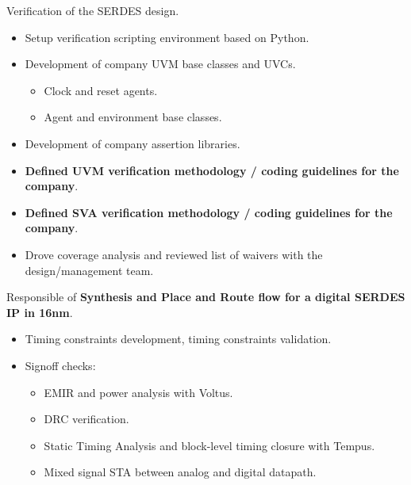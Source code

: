 \begin{cventries}
{\begin{cvitems}
        \item {Verification of the SERDES design.}
        \begin{itemize}
          \item {Setup verification scripting environment based on Python.}
          \item {Development of company UVM base classes and UVCs.}
            \begin{itemize}
              \item {Clock and reset agents.}
              \item {Agent and environment base classes.}
            \end{itemize}
          \item {Development of company assertion libraries.}
          \item {\textbf{Defined UVM verification methodology / coding guidelines for the company}.}
          \item {\textbf{Defined SVA verification methodology / coding guidelines for the company}.}
          \item {Drove coverage analysis and reviewed list of waivers with the design/management team.}
        \end{itemize}
        \item {Responsible of \textbf{Synthesis and Place and Route flow for a digital SERDES IP in 16nm}.}
        \begin{itemize}
          \item {Timing constraints development, timing constraints validation.}
          \item {Signoff checks:}
          \begin{itemize}
            \item {EMIR and power analysis with Voltus.}
            \item {DRC verification.}
            \item {Static Timing Analysis and block-level timing closure with Tempus.}
            \item {Mixed signal STA between analog and digital datapath.}
          \end{itemize}
        \end{itemize}
      \end{cvitems}
    }


\end{cventries}
